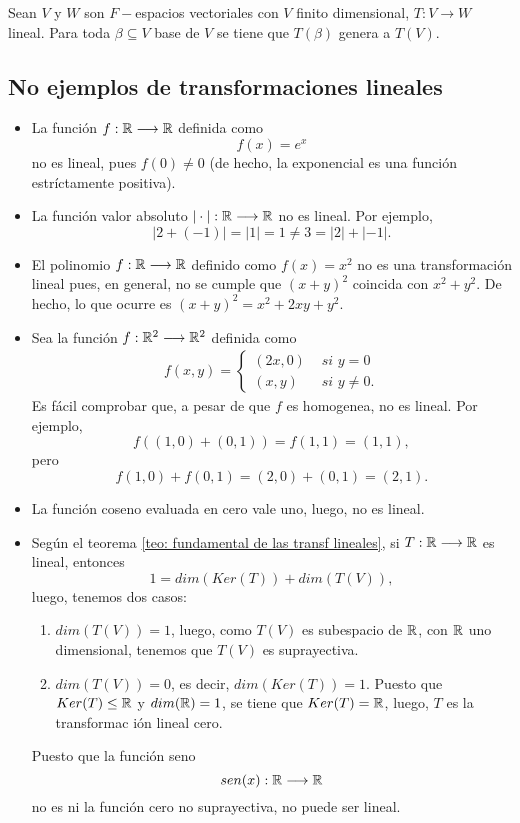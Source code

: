 \begin{cor}
	\label{cor: imagen de base de V bajo lineal genera a W}
Sean $V$ y $W$ son $F-$espacios vectoriales con $V$
finito dimensional, $T: V \longrightarrow W$ lineal.
Para toda $\beta \subseteq V$ base de $V$ se tiene que
$T(\beta)$ genera a $T(V)$.
\end{cor}



\subsection{No ejemplos de transformaciones lineales}

\begin{itemize}
	\item La función $f: \mathbb{R} \longrightarrow \mathbb{R}$ definida como
	\[
	f(x) = e^{x}
	\]
	no es lineal, pues $f(0) \neq 0$ (de hecho, la exponencial
	es una función estríctamente positiva).
	\item La función valor absoluto $| \cdot | : \mathbb{R} \longrightarrow \mathbb{R}$
	no es lineal. Por ejemplo,
	\[
	|2+(-1)| = |1| = 1 \neq 3 = |2| + |-1|.
	\]
	\item El polinomio $f: \mathbb{R} \longrightarrow \mathbb{R}$
	definido como $f(x) = x^{2}$ no es una transformación lineal pues,
	en general, no se cumple que $(x+y)^{2}$ coincida con
	$x^{2} + y^{2}$. De hecho, lo que ocurre es 
	$(x+y)^{2} = x^{2} + 2xy + y^{2}$.
	\item Sea la función $f : \mathbb{R}^{2} \longrightarrow \mathbb{R}^{2}$ definida como
	\begin{align*}
	f(x, y )= \begin{cases}
	(2x, 0) & \textit{ si } y = 0 \\
	(x, y) & \textit{ si } y \neq 0.
	\end{cases}
	\end{align*}
	Es fácil comprobar que, a pesar de que $f$ es homogenea, no es
	lineal. Por ejemplo,
	\[
	f((1, 0) + (0, 1)) = f(1, 1) = (1, 1),
	\]
	pero
	\[
	f(1, 0) + f(0, 1) = (2, 0) + (0, 1) = (2, 1).
	\]
	\item La función coseno evaluada en cero vale uno, luego, 
	no es lineal.
	\item Según el teorema \ref{teo: fundamental de las transf lineales},
	si $T: \mathbb{R} \longrightarrow \mathbb{R}$ es lineal, entonces
	\[
	1 = dim(Ker(T)) + dim(T(V)),
	\]
	luego, tenemos dos casos:
	\begin{enumerate}
		\item $dim(T(V)) = 1$, luego, como $T(V)$ es subespacio
		de $\mathbb{R}$, con $\mathbb{R}$ uno dimensional, tenemos que 
		$T(V)$ es suprayectiva.
		\item $dim(T(V)) = 0$, es decir,
		$dim(Ker(T)) = 1$. Puesto que $Ker(T) \leq \mathbb{R}$
		y $dim(\mathbb{R}) = 1$, se tiene que $Ker(T) = \mathbb{R}$, luego,
		$T$ es la transformac
		ión lineal cero.
	\end{enumerate}
	Puesto que la función seno 
	\[
	sen(x) : \mathbb{R} \longrightarrow \mathbb{R}
	\]
	no es ni la función cero no suprayectiva, no puede ser lineal.
\end{itemize}


